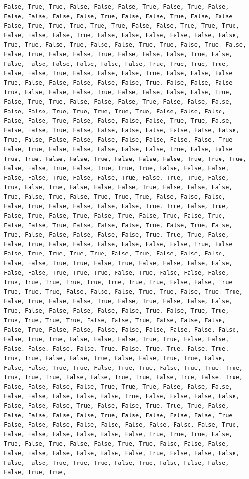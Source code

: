 \documentclass[
  letterpaper,
  DIV=11,
  numbers=noendperiod]{scrartcl}
\begin{document}
\begin{verbatim}
False, True, True, False, False, False, True, False, True, False, False, False, False, False, True, False, False, True, False, False, False, True, True, True, True, True, False, False, True, True, True, False, False, False, True, False, False, False, False, False, False, True, True, False, True, False, False, True, True, False, True, False, False, True, False, False, True, False, False, False, True, False, False, False, False, False, False, False, True, True, True, True, False, False, True, False, False, False, True, False, False, False, True, False, False, False, False, False, True, False, False, False, True, False, False, False, True, False, False, False, False, True, False, True, True, False, False, False, True, False, False, False, False, False, True, True, True, True, True, False, False, False, False, False, True, False, False, False, False, True, True, False, False, False, True, False, False, False, False, False, False, False, True, False, False, False, False, False, False, False, False, True, False, True, False, False, False, False, False, True, False, False, True, True, False, False, True, False, False, False, True, True, True, False, False, True, False, True, True, True, False, False, False, False, False, True, False, False, True, False, True, True, False, True, False, True, False, False, False, True, False, False, False, True, False, True, False, True, True, True, False, False, False, False, True, False, False, False, False, True, True, False, True, False, True, False, True, False, True, False, True, False, True, False, False, True, False, False, False, True, False, True, False, True, False, False, False, False, False, True, True, True, False, False, True, False, False, False, False, False, False, True, False, False, True, True, True, True, False, True, False, False, False, False, False, True, True, False, True, False, False, False, False, False, False, True, True, True, False, True, False, False, False, True, True, True, True, True, True, True, True, False, False, True, True, True, True, False, False, False, True, True, False, True, True, False, True, False, False, True, False, True, False, False, False, True, False, False, False, False, False, True, False, True, True, True, True, True, True, False, False, True, False, False, False, False, True, False, False, False, False, False, False, False, False, False, True, True, False, False, False, True, True, False, False, False, False, False, False, True, False, True, True, False, True, True, True, False, False, True, False, False, True, True, False, False, False, True, True, False, True, True, False, True, True, True, True, True, True, False, False, True, True, False, True, False, True, False, False, False, False, True, True, True, False, False, False, False, False, False, False, False, True, False, False, False, False, False, False, False, True, False, False, True, True, True, False, False, False, False, False, True, False, False, False, False, True, False, False, False, False, False, False, False, False, False, True, False, False, False, False, False, False, True, True, True, False, True, False, True, False, False, True, True, False, False, False, False, False, False, False, False, False, True, False, False, False, False, False, True, True, True, False, True, False, False, False, False, True, True, 
\end{verbatim}
\end{document}
